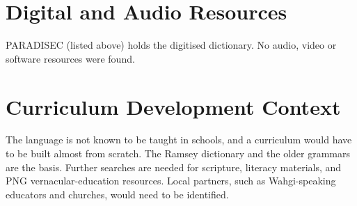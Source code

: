 \documentclass[12pt]{article}
\begin{document}
\section{Digital and Audio Resources}
PARADISEC (listed above) holds the digitised dictionary. No audio, video or software resources were found.

\section{Curriculum Development Context}
The language is not known to be taught in schools, and a curriculum would have to be built almost from scratch. The Ramsey dictionary and the older grammars are the basis. Further searches are needed for scripture, literacy materials, and PNG vernacular-education resources. Local partners, such as Wahgi-speaking educators and churches, would need to be identified.
\end{document}
